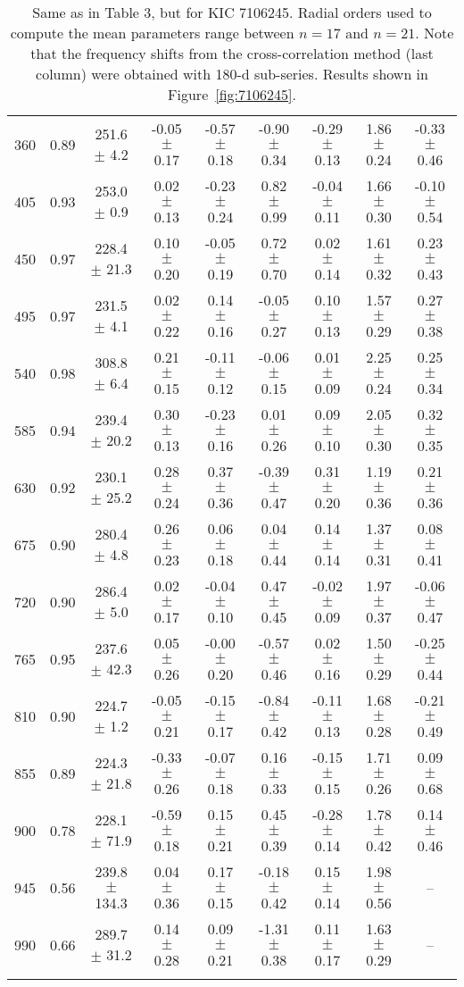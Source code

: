 \documentclass[twocolumn]{aastex61}%
\begin{document}
\begin{table*}[ht]
\begin{tabular}{ccc|ccccc|c}
360 & 0.89 & 251.6 $\pm$ 4.2 & -0.05 $\pm$ 0.17 & -0.57 $\pm$ 0.18 & -0.90 $\pm$ 0.34 & -0.29 $\pm$ 0.13 & 1.86 $\pm$ 0.24 & -0.33 $\pm$ 0.46\\
405 & 0.93 & 253.0 $\pm$ 0.9 & 0.02 $\pm$ 0.13 & -0.23 $\pm$ 0.24 & 0.82 $\pm$ 0.99 & -0.04 $\pm$ 0.11 & 1.66 $\pm$ 0.30 & -0.10 $\pm$ 0.54\\
450 & 0.97 & 228.4 $\pm$ 21.3 & 0.10 $\pm$ 0.20 & -0.05 $\pm$ 0.19 & 0.72 $\pm$ 0.70 & 0.02 $\pm$ 0.14 & 1.61 $\pm$ 0.32 & 0.23 $\pm$ 0.43\\
495 & 0.97 & 231.5 $\pm$ 4.1 & 0.02 $\pm$ 0.22 & 0.14 $\pm$ 0.16 & -0.05 $\pm$ 0.27 & 0.10 $\pm$ 0.13 & 1.57 $\pm$ 0.29 & 0.27 $\pm$ 0.38\\
540 & 0.98 & 308.8 $\pm$ 6.4 & 0.21 $\pm$ 0.15 & -0.11 $\pm$ 0.12 & -0.06 $\pm$ 0.15 & 0.01 $\pm$ 0.09 & 2.25 $\pm$ 0.24 & 0.25 $\pm$ 0.34\\
585 & 0.94 & 239.4 $\pm$ 20.2 & 0.30 $\pm$ 0.13 & -0.23 $\pm$ 0.16 & 0.01 $\pm$ 0.26 & 0.09 $\pm$ 0.10 & 2.05 $\pm$ 0.30 & 0.32 $\pm$ 0.35\\
630 & 0.92 & 230.1 $\pm$ 25.2 & 0.28 $\pm$ 0.24 & 0.37 $\pm$ 0.36 & -0.39 $\pm$ 0.47 & 0.31 $\pm$ 0.20 & 1.19 $\pm$ 0.36 & 0.21 $\pm$ 0.36\\
675 & 0.90 & 280.4 $\pm$ 4.8 & 0.26 $\pm$ 0.23 & 0.06 $\pm$ 0.18 & 0.04 $\pm$ 0.44 & 0.14 $\pm$ 0.14 & 1.37 $\pm$ 0.31 & 0.08 $\pm$ 0.41\\
720 & 0.90 & 286.4 $\pm$ 5.0 & 0.02 $\pm$ 0.17 & -0.04 $\pm$ 0.10 & 0.47 $\pm$ 0.45 & -0.02 $\pm$ 0.09 & 1.97 $\pm$ 0.37 & -0.06 $\pm$ 0.47\\
765 & 0.95 & 237.6 $\pm$ 42.3 & 0.05 $\pm$ 0.26 & -0.00 $\pm$ 0.20 & -0.57 $\pm$ 0.46 & 0.02 $\pm$ 0.16 & 1.50 $\pm$ 0.29 & -0.25 $\pm$ 0.44\\
810 & 0.90 & 224.7 $\pm$ 1.2 & -0.05 $\pm$ 0.21 & -0.15 $\pm$ 0.17 & -0.84 $\pm$ 0.42 & -0.11 $\pm$ 0.13 & 1.68 $\pm$ 0.28 & -0.21 $\pm$ 0.49\\
855 & 0.89 & 224.3 $\pm$ 21.8 & -0.33 $\pm$ 0.26 & -0.07 $\pm$ 0.18 & 0.16 $\pm$ 0.33 & -0.15 $\pm$ 0.15 & 1.71 $\pm$ 0.26 & 0.09 $\pm$ 0.68\\
900 & 0.78 & 228.1 $\pm$ 71.9 & -0.59 $\pm$ 0.18 & 0.15 $\pm$ 0.21 & 0.45 $\pm$ 0.39 & -0.28 $\pm$ 0.14 & 1.78 $\pm$ 0.42 & 0.14 $\pm$ 0.46\\
945 & 0.56 & 239.8 $\pm$ 134.3 & 0.04 $\pm$ 0.36 & 0.17 $\pm$ 0.15 & -0.18 $\pm$ 0.42 & 0.15 $\pm$ 0.14 & 1.98 $\pm$ 0.56 & --\\
990 & 0.66 & 289.7 $\pm$ 31.2 & 0.14 $\pm$ 0.28 & 0.09 $\pm$ 0.21 & -1.31 $\pm$ 0.38 & 0.11 $\pm$ 0.17 & 1.63 $\pm$ 0.29 & --\\\vspace{-0.3cm}
\end{tabular}
\caption{Same as in Table 3, but for KIC 7106245. {Radial orders used to compute the mean parameters range between $n=17$ and $n=21$.} Note that the frequency shifts from the cross-correlation method (last column) were obtained with 180-d sub-series. Results shown in Figure~\ref{fig:7106245}.}\label{tab:7106245}\vspace{-0.1cm}
\end{table*}
\end{document}
